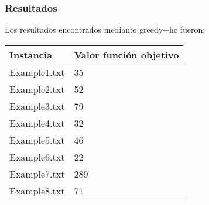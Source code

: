 \frame
{
\frametitle{Resultados}
Los resultados encontrados mediante greedy+hc fueron:
\begin{center}
	\begin{tabular}{|l|l|}
	        \hline
	        Instancia       & Valor función objetivo        \\
	        \hline
	        Example1.txt    & 35                            \\
	        Example2.txt    & 52                            \\
	        Example3.txt    & 79                            \\
	        Example4.txt    & 32                            \\
	        Example5.txt    & 46                            \\
	        Example6.txt    & 22                            \\
	        Example7.txt    & 289                           \\
	        Example8.txt    & 71                            \\
	        \hline
	\end{tabular}
\end{center}
}
